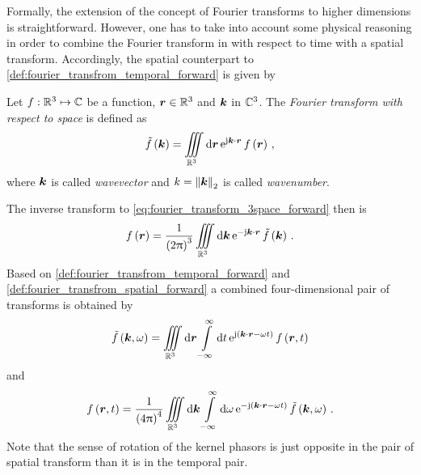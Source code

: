 Formally, the extension of the concept of Fourier transforms to higher
dimensions is straightforward.
However, one has to take into account some physical reasoning in order to
combine the Fourier transform in with respect to time with a spatial transform.
Accordingly, the spatial counterpart to
\cref{def:fourier_transfrom_temporal_forward} is given by
\begin{definition}
	\label{def:fourier_transfrom_spatial_forward}
	Let $f: \mathbb{R}^3 \mapsto \mathbb{C}$ be a function, $\pvec{r} \in \R^3$ and $\pvec{k}$
	in $\mathbb{C}^3$.
	The \emph{Fourier transform with respect to space} is defined as
	\begin{equation}\label{eq:fourier_transform_3space_forward}
		\tilde{f} \left( \pvec{k} \right) = 
		\iiint\limits_{\R^3} \dd \pvec{r} \,
		\exp{\im \pvec{k} \cdot \pvec{r}}
		f \left( \pvec{r} \right) \, ,
	\end{equation}
	where $\pvec{k}$ is called \emph{wavevector} and
	$k = \euclideanNorm{\pvec{k}}$ is called \emph{wavenumber}.
\end{definition}
The inverse transform to \eqref{eq:fourier_transform_3space_forward} then is
\begin{equation}\label{eq:fourier_transform_3space_backward}
	f \left( \pvec{r} \right) = 
	\frac{1}{\left( 2\pi \right)^3}
	\iiint\limits_{\R^3} \dd \pvec{k} \,
	\exp{-\im \pvec{k} \cdot \pvec{r}}
	\tilde{f} \left( \pvec{k} \right) \, .
\end{equation}
Based on \cref{def:fourier_transfrom_temporal_forward} and
\cref{def:fourier_transfrom_spatial_forward} a combined four-dimensional pair
of transforms is obtained by
\begin{equation}\label{eq:fourier_transform_4d_forward}
	\tilde{f} \left( \pvec{k}, \omega \right) = 
	\iiint\limits_{\R^3} \dd \robs
	\int\limits_{-\infty}^{\infty} \dd t \,
	\exp{\im \left( \pvec{k} \cdot \robs - \omega t \right)}
	f \left( \robs, t \right)
\end{equation}
and
\begin{equation}\label{eq:fourier_transform_4d_inverse}
	f \left( \robs, t \right) = 
	\frac{1}{\left(4\pi\right)^4}
	\iiint\limits_{\R^3} \dd \pvec{k}
	\int\limits_{-\infty}^{\infty} \dd \omega \,
	\exp{-\im \left( \pvec{k} \cdot \robs - \omega t \right)}
	\tilde{f} \left( \pvec{k}, \omega \right) \, .
\end{equation}
Note that the sense of rotation of the kernel phasors is just opposite in the
pair of spatial transform than it is in the temporal pair.

